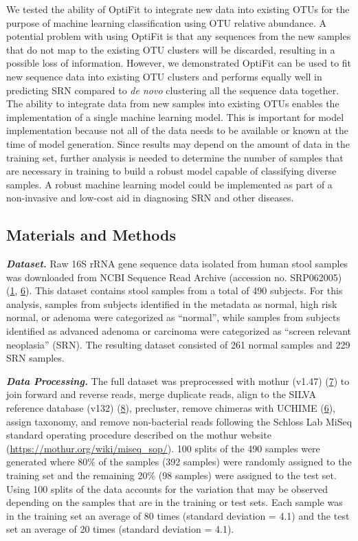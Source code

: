 \documentclass[
]{article}
\begin{document}
We tested the ability of OptiFit to integrate new data into existing
OTUs for the purpose of machine learning classification using OTU
relative abundance. A potential problem with using OptiFit is that any
sequences from the new samples that do not map to the existing OTU
clusters will be discarded, resulting in a possible loss of information.
However, we demonstrated OptiFit can be used to fit new sequence data
into existing OTU clusters and performs equally well in predicting SRN
compared to \emph{de novo} clustering all the sequence data together.
The ability to integrate data from new samples into existing OTUs
enables the implementation of a single machine learning model. This is
important for model implementation because not all of the data needs to
be available or known at the time of model generation. Since results may
depend on the amount of data in the training set, further analysis is
needed to determine the number of samples that are necessary in training
to build a robust model capable of classifying diverse samples. A robust
machine learning model could be implemented as part of a non-invasive
and low-cost aid in diagnosing SRN and other diseases.

\hypertarget{materials-and-methods}{%
\subsection{Materials and Methods}\label{materials-and-methods}}

\textbf{\emph{Dataset.}} Raw 16S rRNA gene sequence data isolated from
human stool samples was downloaded from NCBI Sequence Read Archive
(accession no. SRP062005) (\protect\hyperlink{ref-baxter2016}{1},
\protect\hyperlink{ref-edgar2011}{6}). This dataset contains stool
samples from a total of 490 subjects. For this analysis, samples from
subjects identified in the metadata as normal, high risk normal, or
adenoma were categorized as ``normal'', while samples from subjects
identified as advanced adenoma or carcinoma were categorized as ``screen
relevant neoplasia'' (SRN). The resulting dataset consisted of 261
normal samples and 229 SRN samples.

\textbf{\emph{Data Processing.}} The full dataset was preprocessed with
mothur (v1.47) (\protect\hyperlink{ref-schloss2009}{7}) to join forward
and reverse reads, merge duplicate reads, align to the SILVA reference
database (v132) (\protect\hyperlink{ref-quast2013}{8}), precluster,
remove chimeras with UCHIME (\protect\hyperlink{ref-edgar2011}{6}),
assign taxonomy, and remove non-bacterial reads following the Schloss
Lab MiSeq standard operating procedure described on the mothur website
(\url{https://mothur.org/wiki/miseq_sop/}). 100 splits of the 490
samples were generated where 80\% of the samples (392 samples) were
randomly assigned to the training set and the remaining 20\% (98
samples) were assigned to the test set. Using 100 splits of the data
accounts for the variation that may be observed depending on the samples
that are in the training or test sets. Each sample was in the training
set an average of 80 times (standard deviation = 4.1) and the test set
an average of 20 times (standard deviation = 4.1).
\end{document}
